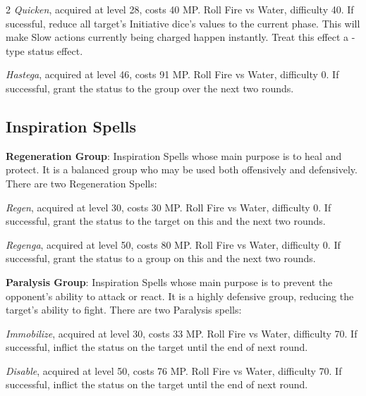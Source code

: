 \begin{multicols}{2}
    \textit{Quicken}, acquired at level 28, costs 40 MP\@. Roll Fire vs Water, difficulty 40. If sucessful, reduce all target's Initiative dice's values to the current phase. This will make Slow actions currently being charged happen instantly. Treat this effect a -type status effect. 

    \textit{Hastega}, acquired at level 46, costs 91 MP\@. Roll Fire vs Water, difficulty 0. If successful, grant the  status to the group over the next two rounds.

    \subsection{Inspiration Spells}\label{subsec:time-inspiration}

    \textbf{Regeneration Group}: Inspiration Spells whose main purpose is to heal and protect. It is a balanced group who may be used both offensively and defensively. There are two Regeneration Spells:
    
    \textit{Regen}, acquired at level 30, costs 30 MP\@. Roll Fire vs Water, difficulty 0. If successful, grant the  status to the target on this and the next two rounds.
    
    \textit{Regenga}, acquired at level 50, costs 80 MP\@. Roll Fire vs Water, difficulty 0. If successful, grant the  status to a group on this and the next two rounds.
 
    \ffcrystal[type=level,height=8pt]
   
    \textbf{Paralysis Group}: Inspiration Spells whose main purpose is to prevent the opponent's ability to attack or react. It is a highly defensive group, reducing the target’s ability to fight. There are two Paralysis spells:
    
    \textit{Immobilize}, acquired at level 30, costs 33 MP\@. Roll Fire vs Water, difficulty 70. If successful, inflict the  status on the target until the end of next round.
    
    \textit{Disable}, acquired at level 50, costs 76 MP\@. Roll Fire vs Water, difficulty 70. If successful, inflict the  status on the target until the end of next round.
    
    \ffcrystal[type=level,height=8pt]


\end{multicols}
